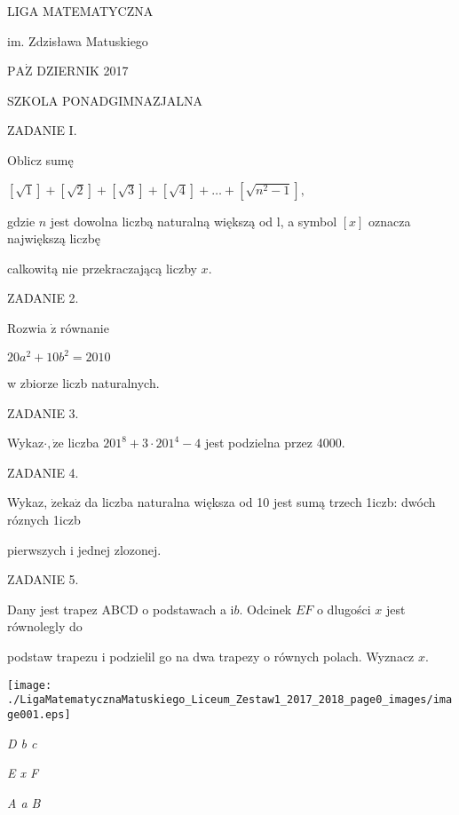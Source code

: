 \documentclass[a4paper,12pt]{article}
\begin{document}
LIGA MATEMATYCZNA

im. Zdzisława Matuskiego

$\mathrm{P}\mathrm{A}\dot{\mathrm{Z}}$ DZIERNIK 2017

SZKOLA PONADGIMNAZJALNA

ZADANIE I.

Oblicz sumę

$[\sqrt{1}]+[\sqrt{2}]+[\sqrt{3}]+[\sqrt{4}]+\ldots+[\sqrt{n^{2}-1}],$

gdzie $n$ jest dowolna liczbą naturalną większą od l, a symbol $[x]$ oznacza największą liczbę

calkowitą nie przekraczającą liczby $x.$

ZADANIE 2.

Rozwia $\dot{\mathrm{z}}$ równanie

$20a^{2}+10b^{2}=2010$

w zbiorze liczb naturalnych.

ZADANIE 3.

Wykaz$\cdot, \dot{\mathrm{z}}\mathrm{e}$ liczba $201^{8}+3\cdot 201^{4}-4$ jest podzielna przez 4000.

ZADANIE 4.

Wykaz, $\dot{\mathrm{z}}\mathrm{e}\mathrm{k}\mathrm{a}\dot{\mathrm{z}}$ da liczba naturalna większa od 10 jest sumą trzech 1iczb: dwóch róznych 1iczb

pierwszych i jednej zlozonej.

ZADANIE 5.

Dany jest trapez ABCD o podstawach a $\mathrm{i} b$. Odcinek $EF$ o dlugości $x$ jest równolegly do

podstaw trapezu i podzielil go na dwa trapezy o równych polach. Wyznacz $x.$
\begin{center}
\texttt{[image: ./LigaMatematycznaMatuskiego\_Liceum\_Zestaw1\_2017\_2018\_page0\_images/image001.eps]}
\end{center}
{\it D  b  c}

{\it E  x  F}

{\it A  a  B}
\end{document}
